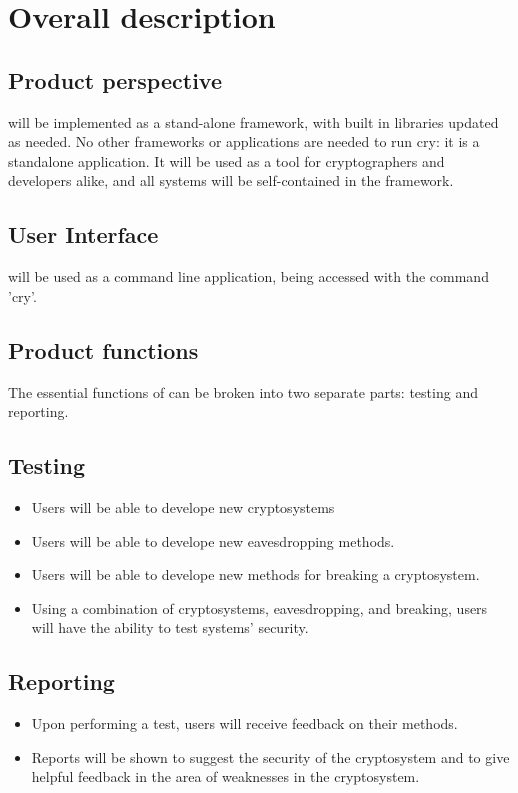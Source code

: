 \section{Overall description}
\dd


\subsection{Product perspective}

\cry{} will be implemented as a stand-alone framework, with built in libraries updated as needed. No other frameworks
or applications are needed to run cry: it is a standalone application. It will be used as a tool for cryptographers and
developers alike, and all systems will be self-contained in the framework.
  \subsection{User Interface}

  \cry{} will be used as a command line application, being accessed with the command 'cry'.


\subsection{Product functions}

The essential functions of \cry{} can be broken into two separate parts: testing and reporting.
  \subsection{Testing}
  \begin{itemize}
    \item Users will be able to develope new cryptosystems
    \item Users will be able to develope new eavesdropping methods.
    \item Users will be able to develope new methods for breaking a cryptosystem.
    \item Using a combination of cryptosystems, eavesdropping, and breaking, users will have the ability
    to test systems' security.
  \end{itemize}
  \subsection{Reporting}
  \begin{itemize}
    \item Upon performing a test, users will receive feedback on their methods.
    \item Reports will be shown to suggest the security of the cryptosystem and to give helpful feedback
    in the area of weaknesses in the cryptosystem.
  \end{itemize}

